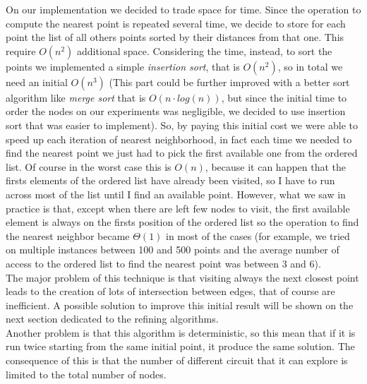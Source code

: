 \noindent On our implementation we decided to trade space for time. Since the operation to compute the nearest point is repeated several time, we decide to store for each point the list of all others points sorted by their distances from that one. This require $O(n^2)$ additional space. Considering the time, instead, to sort the points we implemented a simple \textit{insertion sort}, that is $O(n^2)$, so in total we need an initial $O(n^3)$ (This part could be further improved with a better sort algorithm like \textit{merge sort} that is $O(n \cdot log(n))$, but since the initial time to order the nodes on our experiments was negligible, we decided to use insertion sort that was easier to implement). So, by paying this initial cost we were able to speed up each iteration of nearest neighborhood, in fact each time we needed to find the nearest point we just had to pick the first available one from the ordered list. Of course in the worst case this is $O(n)$, because it can happen that the firsts elements of the ordered list have already been visited, so I have to run across most of the list until I find an available point. However, what we saw in practice is that, except when there are left few nodes to visit, the first available element is always on the firsts position of the ordered list so the operation to find the nearest neighbor became $\Theta(1)$ in most of the cases (for example, we tried on multiple instances between 100 and 500 points and the average number of access to the ordered list to find the nearest point was between 3 and 6). \\

\noindent The major problem of this technique is that visiting always the next closest point leads to the creation of lots of intersection between edges, that of course are inefficient. A possible solution to improve this initial result will be shown on the next section dedicated to the refining algorithms. \\
Another problem is that this algorithm is deterministic, so this mean that if it is run twice starting from the same initial point, it produce the same solution. The consequence of this is that the number of different circuit that it can explore is limited to the total number of nodes.

